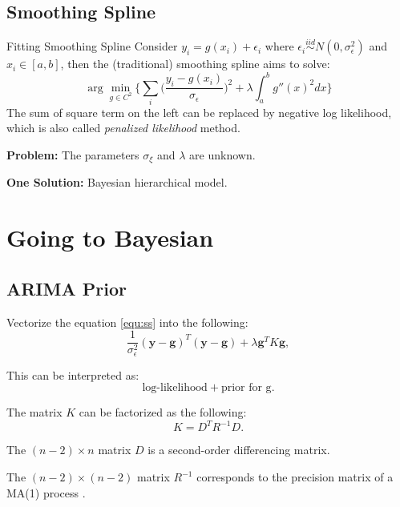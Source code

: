 \documentclass{beamer} %
\begin{document}
\subsection{Smoothing Spline}
\begin{frame}
\begin{block}{Fitting Smoothing Spline}
Consider $y_i = g(x_i) + \epsilon_i$ where $\epsilon_i \overset{iid}\sim N(0,\sigma_\epsilon^2)$ and $x_i \in [a,b]$, then the (traditional) smoothing spline aims to solve:
\pause
\begin{equation}\label{equ:ss}
\arg\min_{g\in C^2} \bigg\{ \sum_i \bigg(\frac{y_i-g(x_i)}{\sigma_\epsilon}\bigg)^2 + \lambda  \int_a^b g''(x)^2 dx \bigg\}
\end{equation}
\pause
The sum of square term on the left can be replaced by negative log likelihood, which is also called \textit{penalized likelihood} method.
\end{block}
\pause
\textbf{Problem:} The parameters $\sigma_\xi$ and $\lambda$ are unknown.

\pause
\textbf{One Solution:} Bayesian hierarchical model.
\end{frame}



\section{Going to Bayesian}

\subsection{ARIMA Prior}
\begin{frame}
Vectorize the equation \ref{equ:ss} into the following:
\pause
\begin{equation}\label{equ:vectorss}
\frac{1}{ \sigma_\epsilon^2}(\boldsymbol{y} - \boldsymbol{g})^T (\boldsymbol{y} - \boldsymbol{g}) + \lambda \boldsymbol{g}^T K \boldsymbol{g},
\end{equation}

\pause
This can be interpreted as:
\begin{equation}\label{equ:interpretation}
\text{log-likelihood} + \text{prior for g}.
\end{equation}

\pause
The matrix $K$ can be factorized as the following:
\pause
\begin{equation}\label{equ:ArimaPrior}
K = D^T R^{-1} D.
\end{equation}

\pause
The $(n-2) \times n$ matrix $D$ is a second-order differencing matrix. 

\pause
The $(n-2) \times (n-2)$ matrix $R^{-1}$ corresponds to the precision matrix of a MA(1) process \citep{ARIMA}.

\end{frame}
\end{document}
